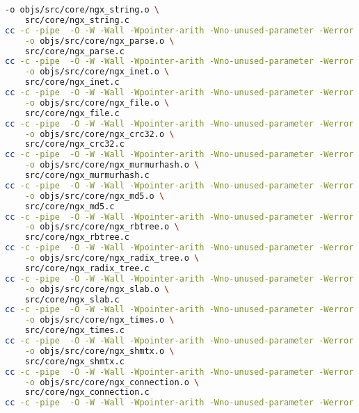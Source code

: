 \begin{lstlisting}[language=bash]
	-o objs/src/core/ngx_string.o \
	src/core/ngx_string.c
cc -c -pipe  -O -W -Wall -Wpointer-arith -Wno-unused-parameter -Werror -g  -I src/core -I src/event -I src/event/modules -I src/os/unix -I objs \
	-o objs/src/core/ngx_parse.o \
	src/core/ngx_parse.c
cc -c -pipe  -O -W -Wall -Wpointer-arith -Wno-unused-parameter -Werror -g  -I src/core -I src/event -I src/event/modules -I src/os/unix -I objs \
	-o objs/src/core/ngx_inet.o \
	src/core/ngx_inet.c
cc -c -pipe  -O -W -Wall -Wpointer-arith -Wno-unused-parameter -Werror -g  -I src/core -I src/event -I src/event/modules -I src/os/unix -I objs \
	-o objs/src/core/ngx_file.o \
	src/core/ngx_file.c
cc -c -pipe  -O -W -Wall -Wpointer-arith -Wno-unused-parameter -Werror -g  -I src/core -I src/event -I src/event/modules -I src/os/unix -I objs \
	-o objs/src/core/ngx_crc32.o \
	src/core/ngx_crc32.c
cc -c -pipe  -O -W -Wall -Wpointer-arith -Wno-unused-parameter -Werror -g  -I src/core -I src/event -I src/event/modules -I src/os/unix -I objs \
	-o objs/src/core/ngx_murmurhash.o \
	src/core/ngx_murmurhash.c
cc -c -pipe  -O -W -Wall -Wpointer-arith -Wno-unused-parameter -Werror -g  -I src/core -I src/event -I src/event/modules -I src/os/unix -I objs \
	-o objs/src/core/ngx_md5.o \
	src/core/ngx_md5.c
cc -c -pipe  -O -W -Wall -Wpointer-arith -Wno-unused-parameter -Werror -g  -I src/core -I src/event -I src/event/modules -I src/os/unix -I objs \
	-o objs/src/core/ngx_rbtree.o \
	src/core/ngx_rbtree.c
cc -c -pipe  -O -W -Wall -Wpointer-arith -Wno-unused-parameter -Werror -g  -I src/core -I src/event -I src/event/modules -I src/os/unix -I objs \
	-o objs/src/core/ngx_radix_tree.o \
	src/core/ngx_radix_tree.c
cc -c -pipe  -O -W -Wall -Wpointer-arith -Wno-unused-parameter -Werror -g  -I src/core -I src/event -I src/event/modules -I src/os/unix -I objs \
	-o objs/src/core/ngx_slab.o \
	src/core/ngx_slab.c
cc -c -pipe  -O -W -Wall -Wpointer-arith -Wno-unused-parameter -Werror -g  -I src/core -I src/event -I src/event/modules -I src/os/unix -I objs \
	-o objs/src/core/ngx_times.o \
	src/core/ngx_times.c
cc -c -pipe  -O -W -Wall -Wpointer-arith -Wno-unused-parameter -Werror -g  -I src/core -I src/event -I src/event/modules -I src/os/unix -I objs \
	-o objs/src/core/ngx_shmtx.o \
	src/core/ngx_shmtx.c
cc -c -pipe  -O -W -Wall -Wpointer-arith -Wno-unused-parameter -Werror -g  -I src/core -I src/event -I src/event/modules -I src/os/unix -I objs \
	-o objs/src/core/ngx_connection.o \
	src/core/ngx_connection.c
cc -c -pipe  -O -W -Wall -Wpointer-arith -Wno-unused-parameter -Werror -g  -I src/core -I src/event -I src/event/modules -I src/os/unix -I objs \

\end{lstlisting}
